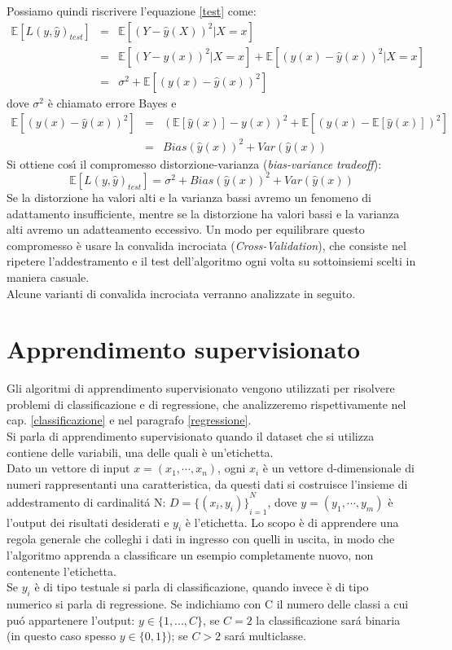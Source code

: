 \documentclass[a4paper,12pt]{report}
\begin{document}
Possiamo quindi riscrivere l'equazione \ref{test} come:
\begin{eqnarray}
\mathbb{E} [L(y,\hat{y})_{test}] &=&\mathbb{E} [(Y-\hat{y}(X))^{2}|X=x]\nonumber\\
&=&\mathbb{E}[(Y-y(x))^2 |X=x]+\mathbb{E}[(y(x)-\hat{y}(x))^{2}|X=x]\nonumber\\
&=&\sigma^{2}+\mathbb{E}[(y(x)-\hat{y}(x))^{2}]
\end{eqnarray}
dove $\sigma^{2}$ \`e chiamato errore Bayes e
\begin{eqnarray}
\mathbb{E}[(y(x)-\hat{y}(x))^{2}]&=&(\mathbb{E}[\hat{y}(x)]-y(x))^{2}+\mathbb{E}[(\hat{y}(x)-\mathbb{E}[\hat{y}(x)])^{2}]\nonumber\\
&=&Bias(\hat{y}(x))^{2}+Var(\hat{y}(x))
\end{eqnarray}
Si ottiene cos\'{\i} il compromesso distorzione-varianza (\textit{bias-variance tradeoff}):
\begin{equation}
\mathbb{E} [L(y,\hat{y})_{test}]=\sigma^2+Bias(\hat{y}(x))^2 + Var(\hat{y}(x))
\end{equation}
Se la distorzione ha valori alti e la varianza bassi avremo un fenomeno di adattamento insufficiente, mentre se la distorzione ha valori bassi e la varianza alti avremo un adatteamento eccessivo.\cite{errval}
Un modo per equilibrare questo compromesso \`e usare la convalida incrociata (\textit{Cross-Validation}), che consiste nel ripetere l'addestramento e il test dell'algoritmo ogni volta su sottoinsiemi scelti in maniera casuale.\\
Alcune varianti di convalida incrociata verranno analizzate in seguito.

\section{Apprendimento supervisionato}
Gli algoritmi di apprendimento supervisionato vengono utilizzati per risolvere problemi di classificazione e di regressione, che analizzeremo rispettivamente nel cap. \ref{classificazione} e nel paragrafo \ref{regressione}.\\
Si parla di apprendimento supervisionato quando il dataset che si utilizza contiene delle variabili, una delle quali \`e un'etichetta.\\
Dato un vettore di input $x=(x_{1},\cdots,x_{n})$, ogni $x_{i}$ \`e un vettore d-dimensionale di numeri rappresentanti una caratteristica, da questi dati si costruisce l'insieme di addestramento di cardinalit\'{a} N: $D={\{ (x_{i},y_{i})\}}^{N}_{i=1}$, dove $y=(y_{1},\cdots,y_{m})$ \`e l'output dei risultati desiderati e $y_{i}$ \`e l'etichetta.
Lo scopo \`e di apprendere una regola generale che colleghi i dati in ingresso con quelli in uscita, in modo che l'algoritmo apprenda a classificare un esempio completamente nuovo, non contenente l'etichetta.\\
Se $y_{i}$ \`e di tipo testuale si parla di classificazione, quando invece \`e di tipo numerico si parla di regressione. Se indichiamo con C il numero delle classi a cui pu\'{o} appartenere l'output: $y\in \{1,...,C\}$, se $C=2$ la classificazione sar\'{a} binaria (in questo caso spesso $y\in \{0,1\}$); se $C>2$ sar\'{a} multiclasse.\\
\end{document}
